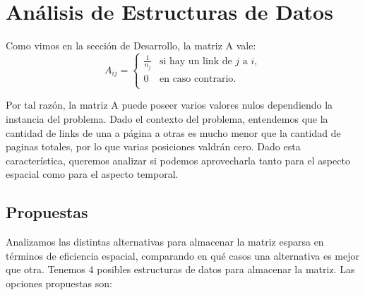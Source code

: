 \section{Análisis de Estructuras de Datos}
Como vimos en la sección de Desarrollo, la matriz A vale: \\

\begin{equation*}
A_{ij} = \left\{
  \begin{array}{cl}
  \frac{1}{n_{j}} & \text{si hay un link de } j \text{ a } i,\\
  0 & \text{en caso contrario.}\\
  \end{array} \right.
\end{equation*}

Por tal razón, la matriz A puede poseer varios valores nulos dependiendo la instancia del problema. Dado el contexto del problema, entendemos que la cantidad de links de una a página a otras es mucho menor que la cantidad de paginas totales, por lo que varias posiciones valdrán cero. Dado esta característica, queremos analizar si podemos aprovecharla tanto para el aspecto espacial como para el aspecto temporal. 

\subsection{Propuestas}
Analizamos las distintas alternativas para almacenar la matriz esparsa en términos de eficiencia espacial, comparando en qué casos una alternativa es mejor que otra. Tenemos 4 posibles estructuras de datos para almacenar la matriz. Las opciones propuestas son: \\

